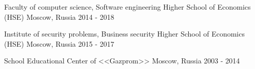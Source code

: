 



\cventryeducation
{Faculty of computer science, Software engineering} %
{Higher School of Economics (HSE)} %
{Moscow, Russia} %
{2014 - 2018} %

\cventryeducation
{Institute of security problems, Business security} %
{Higher School of Economics (HSE)} %
{Moscow, Russia} %
{2015 - 2017} %

\cventryeducation
{School} %
{Educational Center of <<Gazprom>>} %
{Moscow, Russia} %
{2003 - 2014} %



